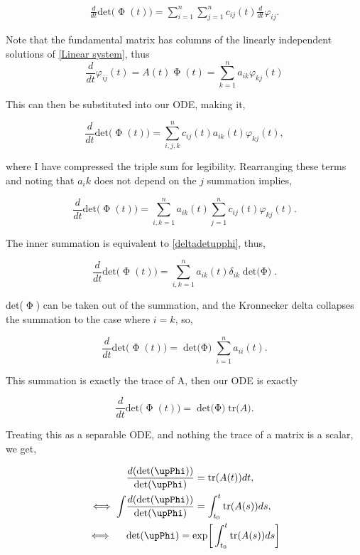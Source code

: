 \documentclass[12pt]{article}
\begin{document}
\begin{enumerate}[]
\begin{solution}
        \begin{align*}
            \frac{d}{dt}\text{det($\upPhi(t)$)} = \sum_{i = 1}^n\sum_{j = 1}^n c_{ij}(t)\frac{d}{dt}\varphi_{ij}.
        \end{align*}

        Note that the fundamental matrix has columns of the linearly independent solutions of \ref{Linear system}, thus 
        \[
        \frac{d}{dt}\varphi_{ij}(t) = A(t)\upPhi(t) = \sum_{k = 1}^n a_{ik}\varphi_{kj}(t)
        \]

        This can then be substituted into our ODE, making it,

        \[
        \frac{d}{dt}\text{det($\upPhi(t)$)} = \sum_{i, j, k}^n c_{ij}(t)a_{ik}(t)\varphi_{kj}(t),
        \]

        where I have compressed the triple sum for legibility. Rearranging these terms and noting that $a_ik$ does not depend on the $j$ summation implies,

        \[
        \frac{d}{dt}\text{det($\upPhi(t)$)} = \sum_{i,k = 1}^na_{ik}(t)\sum_{j = 1}^n c_{ij}(t)\varphi_{kj}(t).
        \]

        The inner summation is equivalent to \ref{deltadetupphi}, thus,

        \[        
        \frac{d}{dt}\text{det($\upPhi(t)$)} = \sum_{i,k = 1}^na_{ik}(t)\delta_{ik}\text{det($\upPhi$)}.
        \]

        det($\upPhi$) can be taken out of the summation, and the Kronnecker delta collapses the summation to the case where $i = k$, so,

        \[        
        \frac{d}{dt}\text{det($\upPhi(t)$)} = \text{det($\upPhi$)}\sum_{i = 1}^na_{ii}(t).
        \]

        This summation is exactly the trace of A, then our ODE is exactly

        \[
        \frac{d}{dt}\text{det($\upPhi(t)$)} = \text{det($\upPhi$)}\text{tr($A$)}.
        \]

        Treating this as a separable ODE, and nothing the trace of a matrix is a scalar, we get,

        \begin{align}
        &\frac{d(\text{det($\upPhi$)})}{\text{det($\upPhi$)}} = \text{tr($A(t)$)}dt, \nonumber\\
         \iff \int &\frac{d(\text{det($\upPhi$)})}{\text{det($\upPhi$)}} = \int_{t_0}^t \text{tr($A(s)$)}ds, \nonumber\\
         \iff \hspace{5mm}&\text{det($\upPhi$)} = \text{exp}\bigg[ \int_{t_0}^t\text{tr($A(s)$)$ds$}\bigg] \label{Abelresult}
        \end{align}


\end{solution}
\end{enumerate}
\end{document}
